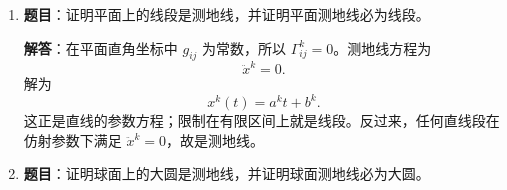 \documentclass[UTF8,12pt,a4paper]{ctexart}
\newcommand{\E}{\mathbb E}
\begin{document}
\begin{enumerate}
设 $S$ 为 $\E^3$ 中的光滑曲面片，$A,B\in U\cap S$。$U\cap S$ 上有一个局部参数化
\[
\varphi_U:(-\epsilon,\epsilon)^2\to S,\qquad
(y^1,y^2)\mapsto\varphi_U(y).
\]
设 $\gamma:(-\epsilon,\epsilon)\to S$ 是 $S$ 上一段光滑正则曲线，$\gamma(0)=A$，$\gamma(\delta)=B$。为方便起见，记 $y_\gamma^i$ 为曲线在参数空间的方程，也就是说
\[
\gamma(t)=\varphi_U\bigl(y_\gamma^1(t),y_\gamma^2(t)\bigr).
\]
\begin{enumerate}
\item 设 $X_v$ 是沿着 $\gamma$ 的平行向量场，$X_v(A)=v$，写出 $X_v=X_v^i\partial_{y^i}$ 满足的方程。
\item 定义
\[
T:T_A(S)\to T_B(S),\qquad v\mapsto X_v(B).
\]
证明 $T$ 是线性映射。
\item 设 $v,w\in T_A(S)$，求证
\[
(v,w)=(T(v),T(w)).
\]
\end{enumerate}

\textbf{解答}：记 $\partial_i=\partial_{y^i}$，并把
\[
X_v(t)=X_v^i(t)\partial_i|_{\gamma(t)},\qquad
v=v^i\partial_i|_A
\]
写成局部参数标架下的分量。沿 $\gamma$ 的协变导数为
\[
\nabla_{\dot\gamma}X_v
=\left({dX_v^k\over dt}
+\Gamma^k_{ij}\bigl(y_\gamma(t)\bigr)\dot y_\gamma^i(t)X_v^j(t)\right)\partial_k.
\]
因此平行向量场方程是
\[
\boxed{
{dX_v^k\over dt}
+\Gamma^k_{ij}\bigl(y_\gamma(t)\bigr)\dot y_\gamma^i(t)X_v^j(t)=0,\qquad k=1,2,
}
\]
并满足初值 $X_v^k(0)=v^k$。

这是关于分量 $X_v^1,X_v^2$ 的线性齐次常微分方程组。若 $X_v,X_w$ 分别是初值为 $v,w$ 的平行场，则 $aX_v+bX_w$ 仍满足同一方程，且初值为 $av+bw$。由解的唯一性，
\[
X_{av+bw}=aX_v+bX_w.
\]
取 $t=\delta$ 得
\[
T(av+bw)=aT(v)+bT(w),
\]
所以 $T$ 是线性映射。反向沿同一曲线从 $B$ 平行移动到 $A$ 给出逆映射，故 $T$ 也是线性同构。

最后证明保持度量。若 $X_v,X_w$ 均沿 $\gamma$ 平行，则由 Riemann 联络与第一基本形式相容，
\[
{d\over dt}(X_v,X_w)
=\bigl(\nabla_{\dot\gamma}X_v,X_w\bigr)
+\bigl(X_v,\nabla_{\dot\gamma}X_w\bigr)=0.
\]
故 $(X_v(t),X_w(t))$ 沿曲线为常数。代入 $t=0$ 与 $t=\delta$，得到
\[
\boxed{(v,w)_A=(T(v),T(w))_B.}
\]

\item \textbf{题目}：证明平面上的线段是测地线，并证明平面测地线必为线段。

\textbf{解答}：在平面直角坐标中 $g_{ij}$ 为常数，所以 $\Gamma^k_{ij}=0$。测地线方程为
\[
\ddot x^k=0.
\]
解为
\[
x^k(t)=a^k t+b^k.
\]
这正是直线的参数方程；限制在有限区间上就是线段。反过来，任何直线段在仿射参数下满足 $\ddot x^k=0$，故是测地线。

\item \textbf{题目}：证明球面上的大圆是测地线，并证明球面测地线必为大圆。


\end{enumerate}
\end{document}
